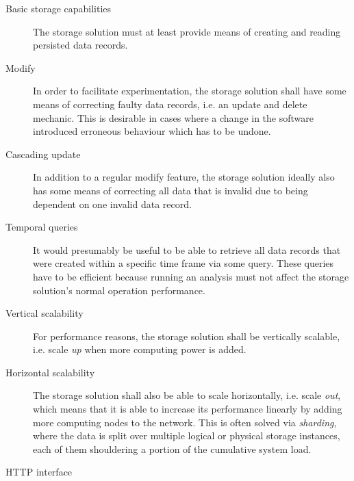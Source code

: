 \begin{description}
\item [Basic storage capabilities]
The storage solution must at least provide means of creating and reading persisted data records.
\item [Modify]
In order to facilitate experimentation, the storage solution shall have some means of correcting faulty data records, i.e. an update and delete mechanic.
This is desirable in cases where a change in the software introduced erroneous behaviour which has to be undone.
\item [Cascading update]
In addition to a regular modify feature, the storage solution ideally also has some means of correcting all data that is invalid due to being dependent on one invalid data record.
\item [Temporal queries]
It would presumably be useful to be able to retrieve all data records that were created within a specific time frame via some query.
These queries have to be efficient because running an analysis must not affect the storage solution's normal operation performance.
\item [Vertical scalability]
For performance reasons, the storage solution shall be vertically scalable, i.e. scale \emph{up} when more computing power is added.
\item [Horizontal scalability]
The storage solution shall also be able to scale horizontally, i.e. scale \emph{out}, which means that it is able to increase its performance linearly by adding more computing nodes to the network.
This is often solved via \emph{sharding}, where the data is split over multiple logical or physical storage instances, each of them shouldering a portion of the cumulative system load.
\item [HTTP interface]

\end{description}
